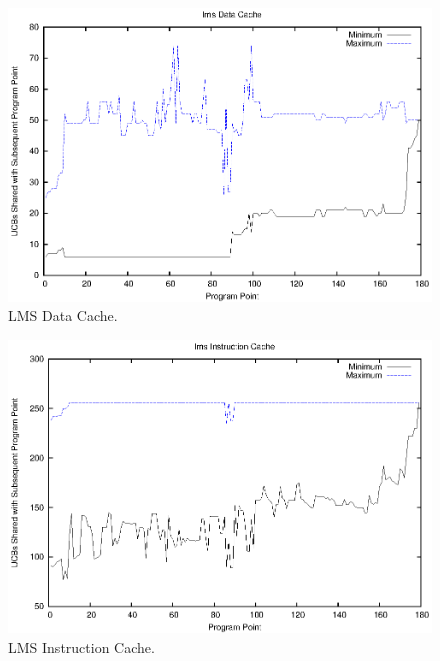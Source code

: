 \begin{figure}[h!]
\vspace{-10pt}
\begin{center}
\includegraphics[width=\linewidth]{eps/lms-dcache.eps}
\caption{LMS Data Cache.}
\label{fig:lms_data_cache}
\end{center}
\end{figure}
%
\begin{figure}[h!]
\vspace{-20pt}
\begin{center}
\includegraphics[width=\linewidth]{eps/lms-icache.eps}
\caption{LMS Instruction Cache.}
\label{fig:lms_instruction_cache}
\end{center}
\vspace{-10pt}
\end{figure}
%

